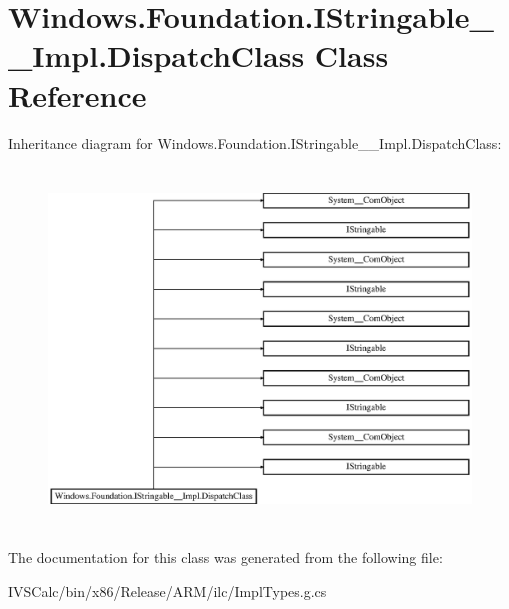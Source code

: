 \hypertarget{class_windows_1_1_foundation_1_1_i_stringable_____impl_1_1_dispatch_class}{}\section{Windows.\+Foundation.\+I\+Stringable\+\_\+\+\_\+\+Impl.\+Dispatch\+Class Class Reference}
\label{class_windows_1_1_foundation_1_1_i_stringable_____impl_1_1_dispatch_class}
Inheritance diagram for Windows.\+Foundation.\+I\+Stringable\+\_\+\+\_\+\+Impl.\+Dispatch\+Class\+:\begin{figure}[H]
\begin{center}
\leavevmode
\includegraphics[height=9.595016cm]{class_windows_1_1_foundation_1_1_i_stringable_____impl_1_1_dispatch_class}
\end{center}
\end{figure}


The documentation for this class was generated from the following file\+:\begin{DoxyCompactItemize}
\item 
I\+V\+S\+Calc/bin/x86/\+Release/\+A\+R\+M/ilc/Impl\+Types.\+g.\+cs\end{DoxyCompactItemize}

